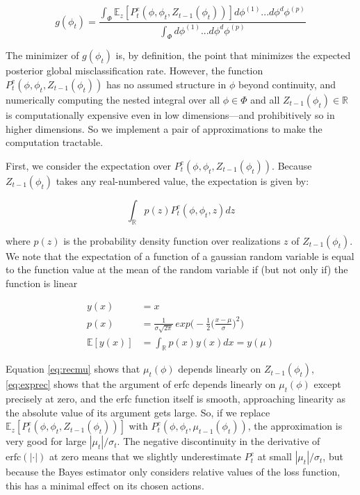 \documentclass[letterpaper, 10 pt, conference]{ieeeconf}  %
\begin{document}
\begin{equation}
    g(\phi_t) = \frac{\int_\Phi \mathbb{E}_{z}[P_t^e(\phi,\phi_t,Z_{t-1}(\phi_t))] d\phi^{(1)}...d\phi^d\phi^{(p)}}{\int_\Phi d\phi^{(1)}...d\phi^d\phi^{(p)}}
    \label{eq:objfull}
\end{equation}
\smallskip

The minimizer of $g(\phi_t)$ is, by definition, the point that minimizes the expected posterior global misclassification rate. However, the function $P_t^e(\phi,\phi_t,Z_{t-1}(\phi_t))$ has no assumed structure in $\phi$ beyond continuity, and numerically computing the nested integral over all $\phi\in\Phi$ and all $Z_{t-1}(\phi_t)\in\mathbb{R}$ is computationally expensive even in low dimensions---and prohibitively so in higher dimensions. So we implement a pair of approximations to make the computation tractable.

First, we consider the expectation over $P_t^e(\phi,\phi_t,Z_{t-1}(\phi_t))$. Because $Z_{t-1}(\phi_t)$ takes any real-numbered value, the expectation is given by:

\begin{equation}
    \int_\mathbb{R}p(z)P_t^e(\phi,\phi_t,z)dz
\end{equation}
\smallskip

where $p(z)$ is the probability density function over realizations $z$ of $Z_{t-1}(\phi_t)$. We note that the expectation of a function of a gaussian random variable is equal to the function value at the mean of the random variable if (but not only if) the function is linear

\begin{align}
    y(x)&=x \nonumber \\
    p(x)&= \frac{1}{\sigma \sqrt{2\pi}}\,exp\Big(-\frac{1}{2}\big(\frac{x-\mu}{\sigma}\big)^2\Big)\nonumber \\
    \mathbb{E}[y(x)]& = \int_\mathbb{R}p(x)y(x)dx = y(\mu)
\end{align}
\smallskip

Equation \eqref{eq:recmu} shows that $\mu_t(\phi)$ depends linearly on $Z_{t-1}(\phi_t)$, \eqref{eq:exprec} shows that the argument of erfc depends linearly on $\mu_t(\phi)$ except precisely at zero, and the erfc function itself is smooth, approaching linearity as the absolute value of its argument gets large. So, if we replace $\mathbb{E}_{z}[P_t^e(\phi,\phi_t,Z_{t-1}(\phi_t))]$ with $P_t^e(\phi,\phi_t,\mu_{t-1}(\phi_t))$, the approximation is very good for large $|\mu_t|/\sigma_t$. The negative discontinuity in the derivative of $\text{erfc}(|\cdot|)$ at zero means that we slightly underestimate $P_t^e$ at small $|\mu_t|/\sigma_t$, but because the Bayes estimator only considers relative values of the loss function, this has a minimal effect on its chosen actions.
\end{document}
